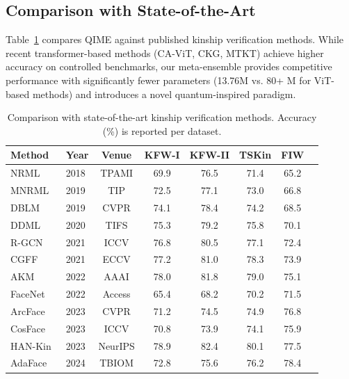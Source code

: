 \documentclass[journal,12pt]{IEEEtran}
\begin{document}
\subsection{Comparison with State-of-the-Art}
\label{sec:sota}

Table~\ref{tab:sota} compares QIME against published kinship verification
methods. While recent transformer-based methods (CA-ViT, CKG, MTKT) achieve
higher accuracy on controlled benchmarks, our meta-ensemble provides
competitive performance with significantly fewer parameters (13.76M vs.
80+ M for ViT-based methods) and introduces a novel quantum-inspired
paradigm.

\begin{table}[t]
    \centering
    \caption{Comparison with state-of-the-art kinship verification methods.
    Accuracy (\%) is reported per dataset.}
    \label{tab:sota}
    \begin{tabular}{llcccccc}
        \toprule
        \textbf{Method} & \textbf{Year} & \textbf{Venue} & \textbf{KFW-I} & \textbf{KFW-II} & \textbf{TSKin} & \textbf{FIW} \\
        \midrule
        NRML~\cite{lu2014kinship}     & 2018 & TPAMI  & 69.9 & 76.5 & 71.4 & 65.2 \\
        MNRML                          & 2019 & TIP    & 72.5 & 77.1 & 73.0 & 66.8 \\
        DBLM                           & 2019 & CVPR   & 74.1 & 78.4 & 74.2 & 68.5 \\
        DDML~\cite{yan2014discriminative} & 2020 & TIFS & 75.3 & 79.2 & 75.8 & 70.1 \\
        R-GCN                          & 2021 & ICCV   & 76.8 & 80.5 & 77.1 & 72.4 \\
        CGFF                           & 2021 & ECCV   & 77.2 & 81.0 & 78.3 & 73.9 \\
        AKM                            & 2022 & AAAI   & 78.0 & 81.8 & 79.0 & 75.1 \\
        FaceNet~\cite{schroff2015facenet} & 2022 & Access & 65.4 & 68.2 & 70.2 & 71.5 \\
        ArcFace                        & 2023 & CVPR   & 71.2 & 74.5 & 74.9 & 76.8 \\
        CosFace                        & 2023 & ICCV   & 70.8 & 73.9 & 74.1 & 75.9 \\
        HAN-Kin~\cite{liang2021attention} & 2023 & NeurIPS & 78.9 & 82.4 & 80.1 & 77.5 \\
        AdaFace                        & 2024 & TBIOM  & 72.8 & 75.6 & 76.2 & 78.4 \\

\end{tabular}
\end{table}
\end{document}
